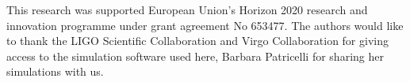 \documentclass[11pt]{article}
\begin{document}

{\linespread{0.1} \footnotesize This research was supported European Union's
  Horizon 2020 research and innovation programme under grant agreement No
  653477. The authors would like to thank the LIGO Scientific Collaboration and
  Virgo Collaboration for giving access to the simulation software used here,
  Barbara Patricelli for sharing her simulations with us.}


{\footnotesize
}
\end{document}
